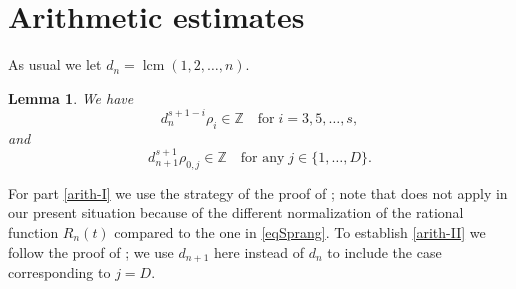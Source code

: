 \documentclass{article}
\numberwithin{equation}{section}
\newtheorem{Lem}{Lemma}
\theoremstyle{remark}
\newcommand{\Z}{\mathbb{Z}}
\begin{document}
\section{Arithmetic estimates}\label{sec3}

As usual we let $d_n = \operatorname{lcm}(1,2,\ldots,n)$.


\begin{Lem} \label{lemarith} 
We have
\begin{equation}
\label{arith-I}
d_n^{s+1-i} \rho_i \in\Z \quad\mbox{for}\; i = 3, 5, \ldots, s,
\end{equation}
and
\begin{equation}
\label{arith-II}
d_{n+1}^{s+1} \rho_{0,j} \in\Z \quad\mbox{for any}\; j\in \{1,\ldots,D\}.
\end{equation}
\end{Lem}

For part \eqref{arith-I} we use the strategy of the proof of \cite[Lemma~4.5]{SFcaract}; note that \cite[Lemma~1.3]{Sprang} does not apply in our present situation   because of the different normalization of the rational function $R_n(t)$ compared to the one in \eqref{eqSprang}.
To establish \eqref{arith-II} we follow the proof of \cite[Lemma~1.4]{Sprang};
we use $d_{n+1}$ here instead of $d_n$ to include the case corresponding to $j=D$.
\end{document}
